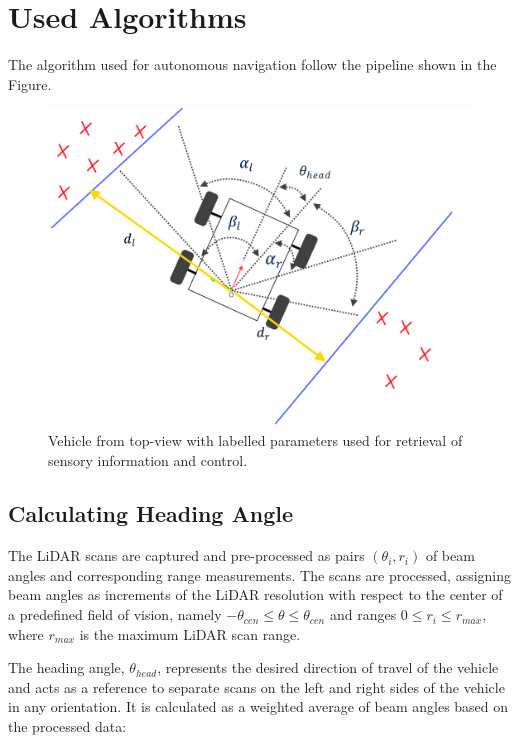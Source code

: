 \documentclass[conference]{IEEEtran}
\begin{document}
\section{Used Algorithms}
The algorithm used for autonomous navigation follow the pipeline shown in the Figure.   

\begin{figure}
    \centering
    \includegraphics[scale=0.2]{diagram.png}
    \caption{Vehicle from top-view with labelled parameters used for retrieval of sensory information and control.}
    \label{Figure 3}
\end{figure}

\subsection{Calculating Heading Angle}

The LiDAR scans are captured and pre-processed as pairs $(\theta_i, r_i)$ of beam angles and corresponding range measurements. The scans are processed, assigning beam angles as increments of the LiDAR resolution with respect to the center of a predefined field of vision, namely $-\theta_{cen} \leq \theta \leq \theta_{cen}$ and ranges $0 \leq r_i \leq r_{max}$, where $r_{max}$ is the maximum LiDAR scan range. 

The heading angle, $\theta_{head}$, represents the desired direction of travel of the vehicle and acts as a reference to separate scans on the left and right sides of the vehicle in any orientation. It is calculated as a weighted average of beam angles based on the processed data:
\end{document}
